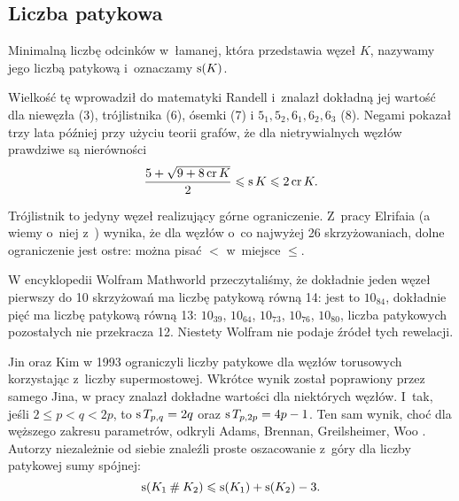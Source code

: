 
\subsection{Liczba patykowa}
%


\begin{definition}
    Minimalną liczbę odcinków w~łamanej, która przedstawia węzeł $K$, nazywamy jego liczbą patykową i~oznaczamy $\operatorname{s}(K)$.
\end{definition}

Wielkość tę wprowadził do matematyki Randell \cite{randell98} i~znalazł dokładną jej wartość dla niewęzła (3), trójlistnika (6), ósemki (7) i $5_1, 5_2, 6_1, 6_2, 6_3$ (8).
%
Negami \cite{negami91} pokazał trzy lata później przy użyciu teorii grafów, że dla nietrywialnych węzłów prawdziwe są nierówności
%
\begin{equation}
    \frac{5+\sqrt{9 + 8 \operatorname{cr} K}}{2} \leqslant \operatorname{s} K \leqslant 2 \operatorname{cr} K.
\end{equation}

Trójlistnik to jedyny węzeł realizujący górne ograniczenie.
Z~pracy Elrifaia \cite{elrifai06} (a wiemy o~niej z~\cite[s. 1]{huh11}) wynika, że dla węzłów o~co najwyżej 26 skrzyżowaniach, dolne ograniczenie jest ostre: można pisać $<$ w~miejsce $\le$.
%

W encyklopedii Wolfram Mathworld przeczytaliśmy, że dokładnie jeden węzeł pierwszy do 10 skrzyżowań ma liczbę patykową równą 14: jest to $10_{84}$, dokładnie pięć ma liczbę patykową równą 13: $10_{39}$, $10_{64}$, $10_{73}$, $10_{76}$, $10_{80}$, liczba patykowych pozostałych nie przekracza 12.
Niestety Wolfram nie podaje źródeł tych rewelacji.

Jin oraz Kim w 1993 ograniczyli liczby patykowe dla węzłów torusowych korzystając z~liczby supermostowej.
%
%
Wkrótce wynik został poprawiony przez samego Jina, w pracy \cite{jin97} znalazł dokładne wartości dla niektórych węzłów.
I~tak, jeśli $2 \le p < q < 2p$, to $\operatorname{s} T_{p,q} = 2q$ oraz $\operatorname{s} T_{p, 2p} = 4p-1$.
Ten sam wynik, choć dla węższego zakresu parametrów, odkryli Adams, Brennan, Greilsheimer, Woo \cite{greilsheimer97}.
%
%
%
%
%
Autorzy niezależnie od siebie znaleźli proste oszacowanie z~góry dla liczby patykowej sumy spójnej:
\begin{equation}
    \operatorname{s}(K_1 \mathbin{\#} K_2) \leqslant \operatorname{s}(K_1) + \operatorname{s}(K_2) - 3.
\end{equation}

